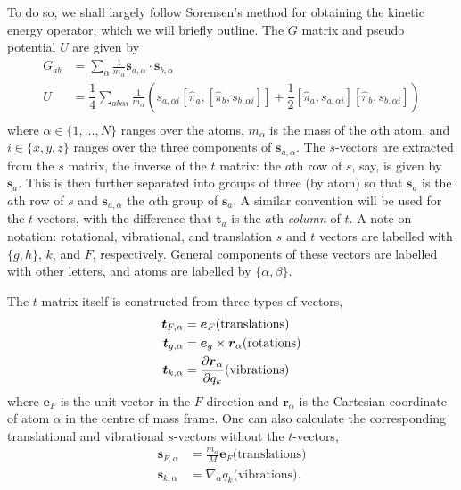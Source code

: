 \documentclass{article}
\newcommand{\vect}[1]{\boldsymbol{#1}}
\begin{document}
To do so, we shall largely follow Sorensen's method for obtaining the kinetic energy operator, which we will briefly outline. The $G$ matrix and pseudo potential $U$ are given by
\[
\begin{split}
G_{ab} &= \sum_{\alpha} \frac{1}{m_\alpha}\vect{s}_{a, \alpha}\cdot \vect{s}_{b, \alpha} \\
U &= \dfrac14 \sum_{ab \alpha i} \frac{1}{m_\alpha}(s_{a,\alpha i}[\hat{\pi}_a,[\hat{\pi}_b, s_{b,\alpha i}]] + \dfrac12 [\hat{\pi}_a, s_{a,\alpha i}][\hat{\pi}_b, s_{b,\alpha i}]) \\
\end{split}
\]
where $\alpha \in \{ 1, \ldots, N \}$ ranges over the atoms, $m_{\alpha}$ is the mass of the $\alpha$th atom, and $i \in \{ x,y,z\}$ ranges over the three components of $\vect{s}_{a,\alpha}$. The $s$-vectors are extracted from the $s$ matrix, the inverse of the $t$ matrix: the $a$th row of $s$, say, is given by $\vect{s}_{a}$. This is then further separated into groups of three (by atom) so that $\vect{s}_{a}$ is the $a$th row of $s$ and $\vect{s}_{a, \alpha}$ the $\alpha$th group of $\vect{s}_a$. A similar convention will be used for the $t$-vectors, with the difference that $\vect{t}_a$ is the $a$th \emph{column} of $t$. A note on notation: rotational, vibrational, and translation $s$ and $t$ vectors are labelled with $\{g, h\}$, $k$, and $F$, respectively. General components of these vectors are labelled with other letters, and atoms are labelled by $\{\alpha, \beta\}$.  

The $t$ matrix itself is constructed from three types of vectors,
\[
\begin{split}
    \vect{t}_{F,\alpha} &= \vect{e}_F  \text{(translations)} \\
    \vect{t}_{g, \alpha} &= \vect{e}_g \times \vect{r}_\alpha \text{(rotations)} \\
    \vect{t}_{k,\alpha} &= \pdv{\vect{r}_\alpha}{q_k} \text{(vibrations)} 
\end{split}
\]
where $\vect{e}_F$ is the unit vector in the $F$ direction and $\vect{r}_\alpha$ is the Cartesian coordinate of atom $\alpha$ in the centre of mass frame. One can also calculate the corresponding translational and vibrational $s$-vectors without the $t$-vectors,
\[
\begin{split}
    \vect{s}_{F,\alpha} &= \frac{m_\alpha}{M}\vect{e}_F \text{(translations)} \\
    \vect{s}_{k, \alpha} &= \nabla_\alpha q_k \text{(vibrations).} \\
\end{split}
\]
\end{document}
